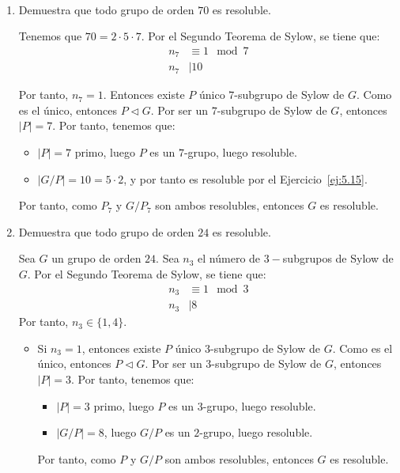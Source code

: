 \begin{ejercicio}~
    \begin{enumerate}
        \item Demuestra que todo grupo de orden $70$ es resoluble.
        
        Tenemos que $70=2\cdot 5\cdot 7$. Por el Segundo Teorema de Sylow, se tiene que:
        \begin{align*}
            n_7 &\equiv 1 \mod 7 \\
            n_7 &\mid 10
        \end{align*}

        Por tanto, $n_7=1$. Entonces existe $P$ único $7$-subgrupo de Sylow de $G$. Como es el único, entonces $P\lhd G$. Por ser un $7$-subgrupo de Sylow de $G$, entonces $|P|=7$. Por tanto, tenemos que:
        \begin{itemize}
            \item $|P|=7$ primo, luego $P$ es un $7$-grupo, luego resoluble.
            \item $|G/P|=10=5\cdot 2$, y por tanto es resoluble por el Ejercicio~\ref{ej:5.15}.
        \end{itemize}

        Por tanto, como $P_7$ y $G/P_7$ son ambos resolubles, entonces $G$ es resoluble.
        \item Demuestra que todo grupo de orden $24$ es resoluble.
        
        Sea $G$ un grupo de orden $24$. Sea $n_3$ el número de $3-$subgrupos de Sylow de $G$. Por el Segundo Teorema de Sylow, se tiene que:
        \begin{align*}
            n_3 &\equiv 1 \mod 3 \\
            n_3 &\mid 8
        \end{align*}
        Por tanto, $n_3\in \{1,4\}$.
        \begin{itemize}
            \item Si $n_3=1$, entonces existe $P$ único $3$-subgrupo de Sylow de $G$. Como es el único, entonces $P\lhd G$. Por ser un $3$-subgrupo de Sylow de $G$, entonces $|P|=3$. Por tanto, tenemos que:
            \begin{itemize}
                \item $|P|=3$ primo, luego $P$ es un $3$-grupo, luego resoluble.
                \item $|G/P|=8$, luego $G/P$ es un $2$-grupo, luego resoluble.
            \end{itemize}
            Por tanto, como $P$ y $G/P$ son ambos resolubles, entonces $G$ es resoluble.



\end{itemize}
\end{enumerate}
\end{ejercicio}
